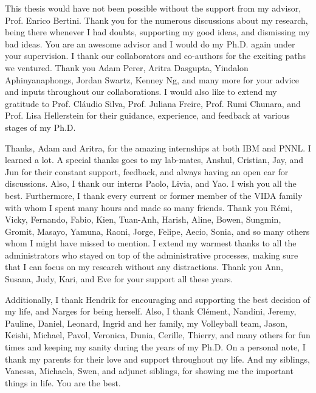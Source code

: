 This thesis would have not been possible without the support from my advisor, Prof. Enrico Bertini. Thank you for the numerous discussions about my research, being there whenever I had doubts, supporting my good ideas, and dismissing my bad ideas.
You are an awesome advisor and I would do my Ph.D. again under your supervision.
I thank our collaborators and co-authors for the exciting paths we ventured.
Thank you Adam Perer, Aritra Dasgupta, Yindalon Aphinyanaphongs, Jordan Swartz, Kenney Ng, and many more for your advice and inputs throughout our collaborations.
I would also like to extend my gratitude to Prof. Cl\'audio Silva, Prof. Juliana Freire, Prof. Rumi Chunara, and Prof. Lisa Hellerstein for their guidance, experience, and feedback at various stages of my Ph.D.

Thanks, Adam and Aritra, for the amazing internships at both IBM and PNNL. I learned a lot.
A special thanks goes to my lab-mates, Anshul, Cristian, Jay, and Jun for their constant support, feedback, and always having an open ear for discussions.
Also, I thank our interns Paolo, Livia, and Yao. I wish you all the best.
Furthermore, I thank every current or former member of the VIDA family with whom I spent many hours and made so many friends. Thank you R\'emi, Vicky, Fernando, Fabio, Kien, Tuan-Anh, Harish, Aline, Bowen, Sungmin, Gromit, Masayo, Yamuna, Raoni, Jorge, Felipe, Aecio, Sonia, and so many others whom I might have missed to mention.
I extend my warmest thanks to all the administrators who stayed on top of the administrative processes, making sure that I can focus on my research without any distractions. Thank you Ann, Susana, Judy, Kari, and Eve for your support all these years.

Additionally, I thank Hendrik for encouraging and supporting the best decision of my life, and Narges for being herself.
Also, I thank Cl\'ement, Nandini, Jeremy, Pauline, Daniel, Leonard, Ingrid and her family, my Volleyball team, Jason, Keishi, Michael, Pavol, Veronica, Dunia, Cerille, Thierry, and many others for fun times and keeping my sanity during the years of my Ph.D.
On a personal note, I thank my parents for their love and support throughout my life.
And my siblings, Vanessa, Michaela, Swen, and adjunct siblings, for showing me the important things in life.
You are the best.

\noindent
{}
\makebox[\textwidth]{\hfill\makebox[3in]{\hfill\graddate\hfill}}
